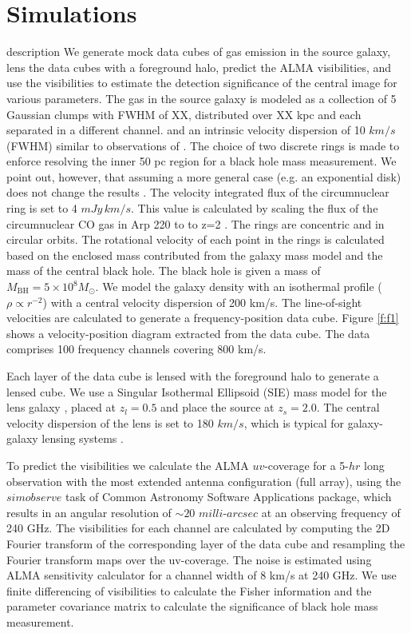 \documentclass[chicago]{emulateapj}
\begin{document}
\section{Simulations}
\begin{framed} description
We generate mock data cubes of gas emission in the source galaxy, lens the data cubes with a foreground halo, predict the ALMA visibilities, and use the visibilities to estimate the detection significance of the central image for various parameters. 
The gas in the source galaxy is modeled as a collection of 5 Gaussian clumps with FWHM of XX, distributed over XX kpc and each separated in a different channel.
and an intrinsic velocity dispersion  of 10 $km/s$ (FWHM) similar to observations of \citet{Davis:13}. 
The choice of two discrete rings is made to enforce resolving the inner 50 pc region for a black hole mass measurement. We point out, however, that assuming a more general case (e.g. an exponential disk) does not change the results \citep[see Figure 2 of ][]{Davis:2014}.
The velocity integrated flux of the circumnuclear ring is set to 4 $mJy\, km/s$. 
This value is calculated by scaling the flux of the circumnuclear CO gas in Arp 220 to to z=2 \citep{Sakamoto:99}.
The rings are concentric and in circular orbits. The rotational velocity of each point in the rings is calculated based on the enclosed mass contributed from the galaxy mass model and the mass of the central black hole. The black hole is given a mass of $M_{\mathrm{BH}}=5\times 10^{8} M_{\odot}$.
We model the galaxy density with an isothermal profile ($\rho\propto r^{-2}$) with a central velocity dispersion of 200 km/s. 
The line-of-sight velocities are calculated to generate a frequency-position data cube. Figure \ref{f:f1} shows a velocity-position diagram extracted from the data cube. The data comprises 100 frequency channels covering 800 km/s. 


Each layer of the data cube is lensed with the foreground halo to  generate a lensed cube. We use a Singular Isothermal Ellipsoid (SIE) mass model for the lens galaxy \citep[$\rho\propto r^{-2}$,][]{Kormann:94}, placed at $z_l=0.5$ and place the source at $z_s=2.0$. The central velocity dispersion of the lens is set to 180 $km/s$, which is typical for galaxy-galaxy lensing systems \citep[e.g.][]{hezaveh:13b}. 


To predict the visibilities we calculate the ALMA $uv$-coverage for a 5-$hr$ long observation with the most extended antenna configuration (full array), using the $simobserve$ task of Common Astronomy Software Applications package, which results in an angular resolution of $\sim20\, \, milli$-$arcsec$ at an observing frequency of 240 GHz. 
The visibilities for each channel are calculated by computing the 2D Fourier transform of the corresponding layer of the data cube and resampling the Fourier transform maps over the uv-coverage. 
The noise is estimated using ALMA sensitivity calculator for a channel width of 8 km/s at 240 GHz. 
We use finite differencing of visibilities to calculate the Fisher information and the parameter covariance matrix to calculate the significance of black hole mass measurement.


\end{framed}
\end{document}
